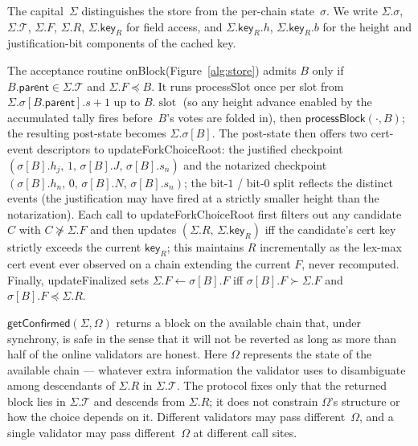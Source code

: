 \ifx\litemode\undefined\documentclass{article}\fi
\newcommand{\T}[0]{\ensuremath{\mathcal{T}}}
\newcommand{\slot}[0]{\ensuremath{\operatorname{\mathrm{slot}}}}
\newcommand{\parent}{\mathsf{parent}}
\newcommand{\key}{\mathsf{key}}
\newcommand{\processSlot}{\textsf{processSlot}\xspace}
\newcommand{\processBlock}{\textsf{processBlock}\xspace}
\newcommand{\onBlock}{\textsf{onBlock}\xspace}
\newcommand{\updateForkChoiceRoot}{\textsf{updateForkChoiceRoot}\xspace}
\newcommand{\updateFinalized}{\textsf{updateFinalized}\xspace}
\newcommand{\getConfirmed}{\textsf{getConfirmed}\xspace}
\theoremstyle{plain}
\theoremstyle{definition}
\theoremstyle{remark}
\begin{document}
The capital~$\Sigma$ distinguishes the store from the per-chain state~$\sigma$.
We write $\Sigma.\sigma$, $\Sigma.\T$, $\Sigma.F$, $\Sigma.R$, $\Sigma.\key_R$ for field access, and $\Sigma.\key_R.h$, $\Sigma.\key_R.b$ for the height and justification-bit components of the cached key.

The acceptance routine \onBlock (Figure~\ref{alg:store}) admits $B$ only if $B.\parent \in \Sigma.\T$ and $\Sigma.F \preceq B$.
It runs \processSlot once per slot from $\Sigma.\sigma[B.\parent].s + 1$ up to $B.\slot$ (so any height advance enabled by the accumulated tally fires before~$B$'s votes are folded in), then $\processBlock(\cdot, B)$; the resulting post-state becomes $\Sigma.\sigma[B]$.
The post-state then offers two cert-event descriptors to \updateForkChoiceRoot: the justified checkpoint $(\sigma[B].h_j,\, 1,\, \sigma[B].J,\, \sigma[B].s_n)$ and the notarized checkpoint $(\sigma[B].h_n,\, 0,\, \sigma[B].N,\, \sigma[B].s_n)$; the bit-$1$ / bit-$0$ split reflects the distinct events (the justification may have fired at a strictly smaller height than the notarization).
Each call to \updateForkChoiceRoot first filters out any candidate~$C$ with $C \not\succeq \Sigma.F$ and then updates $(\Sigma.R,\, \Sigma.\key_R)$ iff the candidate's cert key strictly exceeds the current $\key_R$; this maintains $R$ incrementally as the lex-max cert event ever observed on a chain extending the current $F$, never recomputed.
Finally, \updateFinalized sets $\Sigma.F \gets \sigma[B].F$ iff $\sigma[B].F \succ \Sigma.F$ and $\sigma[B].F \preceq \Sigma.R$.

$\getConfirmed(\Sigma, \Omega)$ returns a block on the available chain that, under synchrony, is safe in the sense that it will not be reverted as long as more than half of the online validators are honest. Here $\Omega$ represents the state of the available chain --- whatever extra information the validator uses to disambiguate among descendants of $\Sigma.R$ in $\Sigma.\T$. The protocol fixes only that the returned block lies in $\Sigma.\T$ and descends from $\Sigma.R$; it does not constrain $\Omega$'s structure or how the choice depends on it. Different validators may pass different~$\Omega$, and a single validator may pass different~$\Omega$ at different call sites.
\end{document}
